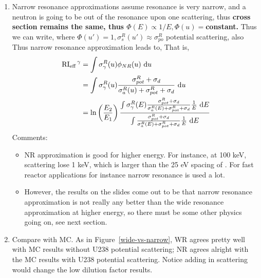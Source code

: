 \documentclass{school-22.211-notes}
\begin{document}
\begin{enumerate}
\item Narrow resonance approximations assume resonance is very narrow, and a neutron is going to be out of the resonance upon one scattering, thus \textbf{cross section remains the same, thus $\Phi(E) \propto 1/E, \Phi(u) = $constant.} Thus we can write, 
where $\Phi(u') = 1, \sigma_{s}^R (u')\approx \sigma_{po}^R$ potential scattering, also 
Thus narrow resonance approximation leads to, 
That is, 
\begin{align}
\left. \mathrm{RI}_{\mathrm{eff}} \right.^{\gamma} &= \int \sigma_{\gamma}^R (u) \phi_{NR} (u) \mbox{ }\mathrm{d} u \\
&= \int \sigma_{\gamma}^R (u) \frac{\sigma_{pot}^R + \sigma_d}{\sigma_a^R(u) + \sigma_{pot}^R + \sigma_d} \mbox{ }\mathrm{d} u \\
&= \ln\left( \frac{E_2}{E_1} \right) \frac{ \int \sigma_{\gamma}^R (E) \frac{\sigma_{pot}^R + \sigma_d}{\sigma_{a}^R(E) + \sigma_{pot}^R + \sigma_d} \frac{1}{E} \mbox{ }\mathrm{d} E}{ \int \frac{\sigma_{pot}^R + \sigma_d}{\sigma_{a}^R(E) + \sigma_{pot}^R + \sigma_d} \frac{1}{E} \mbox{ }\mathrm{d} E}
\end{align}
Comments:
\begin{itemize}
\item NR approximation is good for higher energy. For instance, at 100 keV, scattering lose 1 keV, which is larger than the 25 eV spacing of . For fast reactor applications for instance narrow resonance is used a lot. 

\item However, the results on the slides come out to be that narrow resonance approximation is not really any better than the wide resonance approximation at higher energy, so there must be some other physics going on, see next section. 
\end{itemize}

\item Compare with MC\label{narrow-wide-compr}. As in Figure~\ref{wide-vs-narrow}, WR agrees pretty well with MC results without U238 potential scattering; NR agrees alright with the MC results with U238 potential scattering. Notice adding in scattering would change the low dilution factor results.


\end{enumerate}
\end{document}
